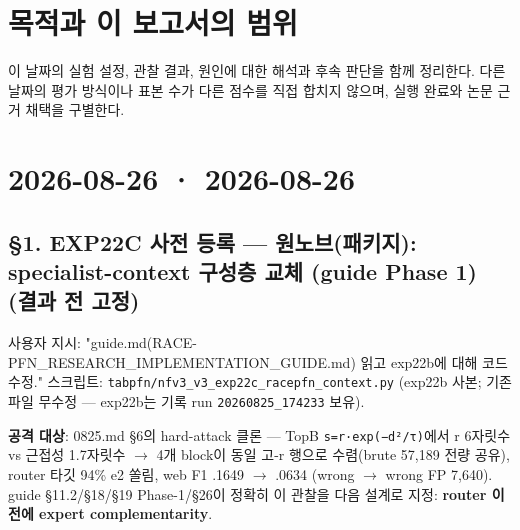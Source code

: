 




\section*{목적과 이 보고서의 범위}

이 날짜의 실험 설정, 관찰 결과, 원인에 대한 해석과 후속 판단을 함께 정리한다. 다른 날짜의 평가 방식이나 표본 수가 다른 점수를 직접 합치지 않으며, 실행 완료와 논문 근거 채택을 구별한다.


\section{2026-08-26 · 2026-08-26}
\label{report:20260826_0826}
\subsection{§1. EXP22C 사전 등록 — 원노브(패키지): specialist-context 구성층 교체 (guide Phase 1) (결과 전 고정)}
사용자 지시: "guide.md(RACE-PFN\_\allowbreak{}RESEARCH\_\allowbreak{}IMPLEMENTATION\_\allowbreak{}GUIDE.md) 읽고 exp22b에 대해 코드 수정." 스크립트: \texttt{tabpfn/\allowbreak{}\allowbreak{}n\allowbreak{}fv3\_\allowbreak{}\allowbreak{}v3\_\allowbreak{}\allowbreak{}e\allowbreak{}xp22c\_\allowbreak{}\allowbreak{}ra\allowbreak{}cepfn\_\allowbreak{}\allowbreak{}co\allowbreak{}ntext.\allowbreak{}py\allowbreak{}} (exp22b 사본; 기존 파일 무수정 — exp22b는 기록 run \texttt{20260825\allowbreak{}\_\allowbreak{}\allowbreak{}174233} 보유).

\textbf{공격 대상}: 0825.md §6의 hard-attack 클론 — TopB \texttt{s=\allowbreak{}\allowbreak{}r·exp(\allowbreak{}−d²/\allowbreak{}\allowbreak{}τ)}에서 r 6자릿수 vs 근접성 1.7자릿수  \ensuremath{\rightarrow}  4개 block이 동일 고-r 행으로 수렴(brute 57,189 전량 공유), router 타깃 94\% e2 쏠림, web F1 .1649 \ensuremath{\rightarrow} .0634 (wrong \ensuremath{\rightarrow} wrong FP 7,640). guide §11.2/\allowbreak{}§18/\allowbreak{}§19 Phase-1/\allowbreak{}§26이 정확히 이 관찰을 다음 설계로 지정: \textbf{router 이전에 expert complementarity}.

